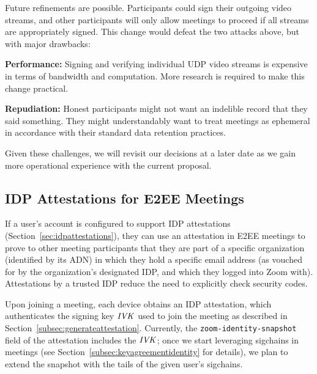 Future refinements are possible. Participants could sign their outgoing video streams, and other
participants will only allow meetings to proceed if all streams are appropriately signed. This
change would defeat the two attacks above, but with major drawbacks:
%
\begin{description}
    \item {\bf Performance:} Signing and verifying individual UDP video streams is expensive in
    terms of bandwidth and computation. More research is required to make this change practical.
    \item {\bf Repudiation:} Honest participants might not want an indelible record that they said
    something. They might understandably want to treat meetings as ephemeral in accordance with
    their standard data retention practices.
\end{description}

Given these challenges, we will revisit our decisions at a later date as we gain more operational
experience with the current proposal.

\subsection{IDP Attestations for E2EE Meetings}
\label{subsec:idpattestationmeetings}

If a user's account is configured to support IDP attestations
(Section~\ref{sec:idpattestations}), they can use an attestation in E2EE
meetings to prove to other meeting participants that they are part of a specific
organization (identified by its ADN) in which they hold a specific email address
(as vouched for by the organization's designated IDP, and which they logged into
Zoom with). Attestations by a trusted IDP reduce the need to explicitly check security codes.

Upon joining a meeting, each device obtains an IDP attestation, which
authenticates the signing key $\mathit{IVK}$ used to join the meeting as described in
Section~\ref{subsec:generateattestation}. Currently, the \texttt{zoom-identity-snapshot} field of the attestation
includes the $\mathit{IVK}$; once we start leveraging sigchains in meetings (see
Section~\ref{subsec:keyagreementidentity} for details),  we plan to extend the
snapshot with the tails of the given user's sigchains. 

